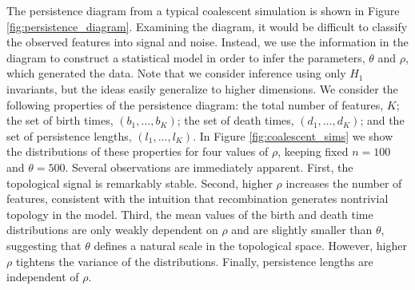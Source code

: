 The persistence diagram from a typical coalescent simulation is shown in Figure \ref{fig:persistence_diagram}.
Examining the diagram, it would be difficult to classify the observed features into signal and noise.
Instead, we use the information in the diagram to construct a statistical model in order to infer the parameters, $\theta$ and $\rho$, which generated the data.
Note that we consider inference using only $H_1$ invariants, but the ideas easily generalize to higher dimensions.
We consider the following properties of the persistence diagram: the total number of features, $K$; the set of birth times, $(b_1,{\ldots},b_K)$; the set of death times, $(d_1,{\ldots},d_K)$; and the set of persistence lengths, $(l_1,{\ldots},l_K)$.
In Figure \ref{fig:coalescent_sims} we show the distributions of these properties for four values of $\rho$, keeping fixed $n=100$ and $\theta=500$.
Several observations are immediately apparent.
First, the topological signal is remarkably stable.
Second, higher $\rho$ increases the number of features, consistent with the intuition that recombination generates nontrivial topology in the model.
Third, the mean values of the birth and death time distributions are only weakly dependent on $\rho$ and are slightly smaller than $\theta$, suggesting that $\theta$ defines a natural scale in the topological space.
However, higher $\rho$ tightens the variance of the distributions.
Finally, persistence lengths are independent of $\rho$.

